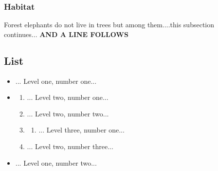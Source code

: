 \documentclass{article}
\begin{document}
\subsubsection*{Habitat}
 
\par Forest elephants do not live in trees but among them....this subsection continues... \textbf{AND A LINE FOLLOWS}

 
\subsection*{List}
 \begin{itemize}
\item \hspace{1pt}... Level one, number one...
\item \hspace{1pt}\begin{enumerate}
\item \hspace{1pt}... Level two, number one...
\item \hspace{1pt}... Level two, number two...
\item \hspace{1pt}\begin{enumerate}
\item \hspace{1pt}... Level three, number one...
\end{enumerate}

\item \hspace{1pt}... Level two, number three...
\end{enumerate}

\item \hspace{1pt}... Level one, number two...
\end{itemize}
\end{document}
